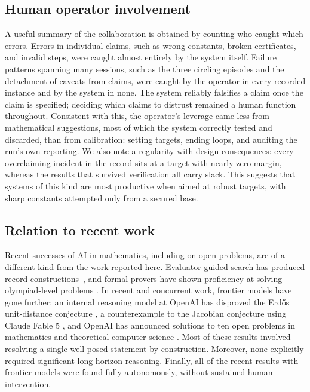 \subsection{Human operator involvement}

A useful summary of the collaboration is obtained by counting who caught
which errors. Errors in individual claims, such as wrong constants, broken
certificates, and invalid steps, were caught almost entirely by the system
itself. Failure patterns spanning many sessions, such as the three circling
episodes and the detachment of caveats from claims, were caught by the
operator in every recorded instance and by the system in none. The system
reliably falsifies a claim once the claim is specified; deciding which
claims to distrust remained a human function throughout. Consistent with
this, the operator's leverage came less from mathematical suggestions, most
of which the system correctly tested and discarded, than from calibration:
setting targets, ending loops, and auditing the run's own reporting. We also
note a regularity with design consequences: every overclaiming incident in
the record sits at a target with nearly zero margin, whereas the results
that survived verification all carry slack. This suggests that systems of
this kind are most productive when aimed at robust targets, with sharp
constants attempted only from a secured base.

\subsection{Relation to recent work}

Recent successes of AI in mathematics, including on open problems, are of
a different kind from the work reported here. Evaluator-guided search has
produced record
constructions~\cite{funsearch,novikov2025alphaevolvecodingagentscientific, charton2024patternboostconstructionsmathematicslittle},
and formal provers have shown proficiency at solving olympiad-level
problems \cite{novikov2025alphaevolvecodingagentscientific}.
In recent and concurrent work, frontier models have gone further: an
internal reasoning model at OpenAI has disproved the Erd\H{o}s
unit-distance conjecture \cite{openai2026planarpointsets}, a counterexample to the Jacobian conjecture using Claude Fable 5
\cite{jacobian}, and OpenAI has announced solutions to ten open problems in mathematics and theoretical computer
science \cite{openai2026ten}. Most of these results involved resolving a
single well-posed statement by construction. Moreover, none explicitly
required significant long-horizon reasoning. Finally, all of the recent
results with frontier models were found fully autonomously, without
sustained human intervention.

